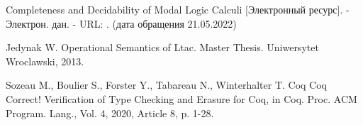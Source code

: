 \documentclass[12pt]{article}
\begin{document}
\begin{thebibliography}{99}
     Completeness and Decidability of Modal Logic Calculi [Электронный ресурс]. - Электрон. дан. - URL: . (дата обращения 21.05.2022)

     Jedynak W. Operational Semantics of Ltac. Master Thesis. Uniwersytet Wroclawski, 2013.
    
     Sozeau M., Boulier S., Forster Y., Tabareau N., Winterhalter T. Coq Coq Correct! Verification of Type Checking and Erasure for Coq, in Coq. Proc. ACM Program. Lang., Vol. 4, 2020, Article 8, p. 1-28.
  \end{thebibliography}




  
\end{document}
